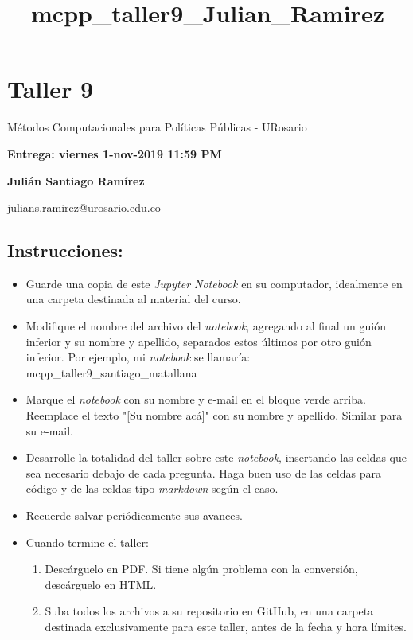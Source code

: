 \documentclass[11pt]{article}
\title{mcpp\_taller9\_Julian\_Ramirez}
\providecommand{\tightlist}{%
      \setlength{\itemsep}{0pt}\setlength{\parskip}{0pt}}
\begin{document}
    
    
    \maketitle
    
    

    
    \section{Taller 9}\label{taller-9}

Métodos Computacionales para Políticas Públicas - URosario

\textbf{Entrega: viernes 1-nov-2019 11:59 PM}

    \textbf{Julián Santiago Ramírez}

julians.ramirez@urosario.edu.co

    \subsection{Instrucciones:}\label{instrucciones}

\begin{itemize}
\tightlist
\item
  Guarde una copia de este \emph{Jupyter Notebook} en su computador,
  idealmente en una carpeta destinada al material del curso.
\item
  Modifique el nombre del archivo del \emph{notebook}, agregando al
  final un guión inferior y su nombre y apellido, separados estos
  últimos por otro guión inferior. Por ejemplo, mi \emph{notebook} se
  llamaría: mcpp\_taller9\_santiago\_matallana
\item
  Marque el \emph{notebook} con su nombre y e-mail en el bloque verde
  arriba. Reemplace el texto "{[}Su nombre acá{]}" con su nombre y
  apellido. Similar para su e-mail.
\item
  Desarrolle la totalidad del taller sobre este \emph{notebook},
  insertando las celdas que sea necesario debajo de cada pregunta. Haga
  buen uso de las celdas para código y de las celdas tipo
  \emph{markdown} según el caso.
\item
  Recuerde salvar periódicamente sus avances.
\item
  Cuando termine el taller:

  \begin{enumerate}
  \def\labelenumi{\arabic{enumi}.}
  \tightlist
  \item
    Descárguelo en PDF. Si tiene algún problema con la conversión,
    descárguelo en HTML.
  \item
    Suba todos los archivos a su repositorio en GitHub, en una carpeta
    destinada exclusivamente para este taller, antes de la fecha y hora
    límites.
  \end{enumerate}
\end{itemize}
\end{document}
